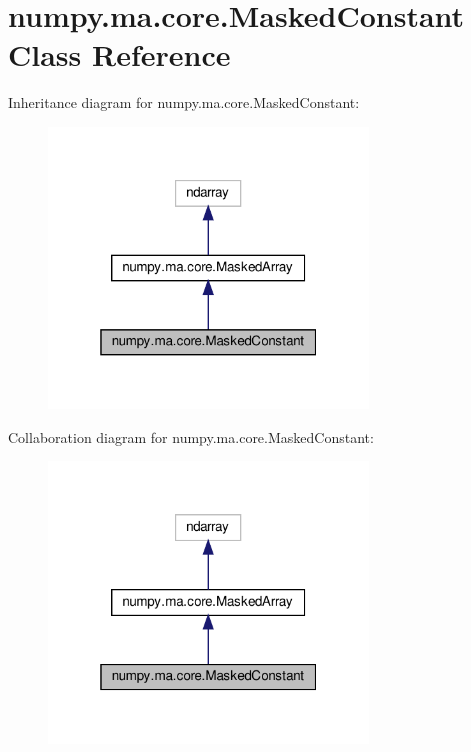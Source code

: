 \hypertarget{classnumpy_1_1ma_1_1core_1_1MaskedConstant}{}\section{numpy.\+ma.\+core.\+Masked\+Constant Class Reference}
\label{classnumpy_1_1ma_1_1core_1_1MaskedConstant}


Inheritance diagram for numpy.\+ma.\+core.\+Masked\+Constant\+:
\nopagebreak
\begin{figure}[H]
\begin{center}
\leavevmode
\includegraphics[width=241pt]{classnumpy_1_1ma_1_1core_1_1MaskedConstant__inherit__graph}
\end{center}
\end{figure}


Collaboration diagram for numpy.\+ma.\+core.\+Masked\+Constant\+:
\nopagebreak
\begin{figure}[H]
\begin{center}
\leavevmode
\includegraphics[width=241pt]{classnumpy_1_1ma_1_1core_1_1MaskedConstant__coll__graph}
\end{center}
\end{figure}

